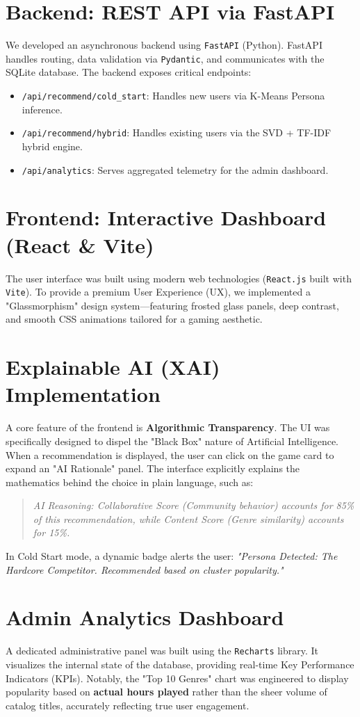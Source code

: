 \documentclass[12pt, a4paper]{report}
\begin{document}
\section{Backend: REST API via FastAPI}
We developed an asynchronous backend using \texttt{FastAPI} (Python). FastAPI handles routing, data validation via \texttt{Pydantic}, and communicates with the SQLite database. The backend exposes critical endpoints:
\begin{itemize}
    \item \texttt{/api/recommend/cold\_start}: Handles new users via K-Means Persona inference.
    \item \texttt{/api/recommend/hybrid}: Handles existing users via the SVD + TF-IDF hybrid engine.
    \item \texttt{/api/analytics}: Serves aggregated telemetry for the admin dashboard.
\end{itemize}

\section{Frontend: Interactive Dashboard (React \& Vite)}
The user interface was built using modern web technologies (\texttt{React.js} built with \texttt{Vite}). To provide a premium User Experience (UX), we implemented a "Glassmorphism" design system—featuring frosted glass panels, deep contrast, and smooth CSS animations tailored for a gaming aesthetic.

\section{Explainable AI (XAI) Implementation}
A core feature of the frontend is \textbf{Algorithmic Transparency}. The UI was specifically designed to dispel the "Black Box" nature of Artificial Intelligence. 
When a recommendation is displayed, the user can click on the game card to expand an "AI Rationale" panel. The interface explicitly explains the mathematics behind the choice in plain language, such as:
\begin{quote}
\textit{AI Reasoning: Collaborative Score (Community behavior) accounts for 85\% of this recommendation, while Content Score (Genre similarity) accounts for 15\%.}
\end{quote}
In Cold Start mode, a dynamic badge alerts the user: \textit{"Persona Detected: The Hardcore Competitor. Recommended based on cluster popularity."}

\section{Admin Analytics Dashboard}
A dedicated administrative panel was built using the \texttt{Recharts} library. It visualizes the internal state of the database, providing real-time Key Performance Indicators (KPIs). Notably, the "Top 10 Genres" chart was engineered to display popularity based on \textbf{actual hours played} rather than the sheer volume of catalog titles, accurately reflecting true user engagement.
\end{document}
